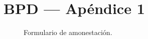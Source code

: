 \appendix
\pagestyle{formato}
\renewcommand{\MayorVer}{1}
\renewcommand{\MenorVer}{0}
\renewcommand{\Codigo}{BPD-PROG}
\renewcommand{\FechaPub}{2023--01}
\renewcommand{\Titulo}{BPD --- Apéndice 1}

\section{\Titulo}
\label{AP1}
\begin{figure}[h!]
	\centering
    \label{F-amonest}
	\caption{Formulario de amonestación.}
\end{figure}